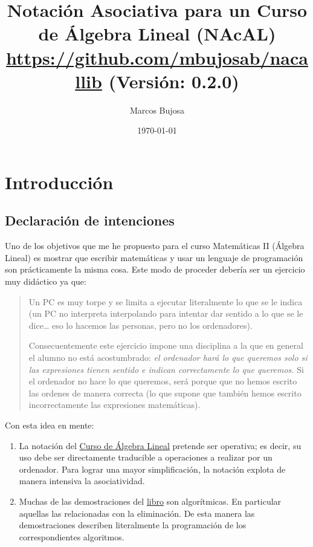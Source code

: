 \documentclass[11pt]{report}
\author{Marcos Bujosa}
\date{\today}
\title{Notación Asociativa para un Curso de Álgebra Lineal (NAcAL)\\\medskip
\large \url{https://github.com/mbujosab/nacallib} (Versión:  0.2.0)}
\begin{document}
\tableofcontents

\maketitle


\section*{Introducción}
\label{sec:org0768976}
\subsection*{Declaración de intenciones}
\label{sec:org3bc0224}
Uno de los objetivos que me he propuesto para el curso Matemáticas II (Álgebra Lineal) es mostrar
que escribir matemáticas y usar un lenguaje de programación son prácticamente la misma cosa. Este
modo de proceder debería ser un ejercicio muy didáctico ya que:
\begin{quote}
Un PC es muy torpe y se limita a ejecutar literalmente lo que se le indica (un PC no interpreta
interpolando para intentar dar sentido a lo que se le dice\ldots{} eso lo hacemos las personas, pero no
los ordenadores).

Consecuentemente este ejercicio impone una disciplina a la que en general el alumno no está
acostumbrado: \emph{el ordenador hará lo que queremos solo si las expresiones tienen sentido e indican
correctamente lo que queremos.} Si el ordenador no hace lo que queremos, será porque que no hemos
escrito las ordenes de manera correcta (lo que supone que también hemos escrito incorrectamente las
expresiones matemáticas).
\end{quote}

Con esta idea en mente:

\begin{enumerate}
\item La notación del \href{https://github.com/mbujosab/CursoDeAlgebraLineal/blob/master/libro.pdf}{Curso de Álgebra Lineal} pretende ser operativa; es decir, su uso debe ser
directamente traducible a operaciones a realizar por un ordenador. Para lograr una mayor
simplificación, la notación explota de manera intensiva la asociatividad.

\item Muchas de las demostraciones del \href{https://github.com/mbujosab/CursoDeAlgebraLineal/blob/master/libro.pdf}{libro} son algorítmicas. En particular aquellas las relacionadas
con la eliminación. De esta manera las demostraciones describen literalmente la programación de
los correspondientes algoritmos.
\end{enumerate}
\end{document}
